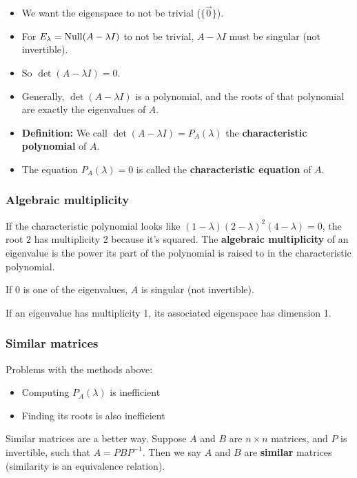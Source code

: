 \begin{itemize}
    \item We want the eigenspace to not be trivial ($\{\Vec 0\}$).
    \item For $E_{\lambda} = \operatorname{Null}(A - \lambda I)$ to not be trivial, $A - \lambda I$ must be singular (not invertible).
    \item So $\det(A - \lambda I) = 0$.
    \item Generally, $\det(A - \lambda I)$ is a polynomial, and the roots of that polynomial are exactly the eigenvalues of $A$.
    \item \textbf{Definition:} We call $\det(A - \lambda I) = P_A(\lambda)$ the \textbf{characteristic polynomial} of $A$.
    \item The equation $P_A(\lambda) = 0$ is called the \textbf{characteristic equation} of $A$.
\end{itemize}

\subsubsection*{Algebraic multiplicity}

If the characteristic polynomial looks like $(1 - \lambda)(2 - \lambda)^2(4 - \lambda) = 0$, the root $2$ has multiplicity 2 because it's squared. The \textbf{algebraic multiplicity} of an eigenvalue is the power its part of the polynomial is raised to in the characteristic polynomial.

If 0 is one of the eigenvalues, $A$ is singular (not invertible).

If an eigenvalue has multiplicity 1, its associated eigenspace has dimension 1.

\subsubsection*{Similar matrices}

Problems with the methods above:
\begin{itemize}
    \item Computing $P_A(\lambda)$ is inefficient
    \item Finding its roots is also inefficient
\end{itemize}

Similar matrices are a better way. Suppose $A$ and $B$ are $n \times n$ matrices, and $P$ is invertible, such that $A = PBP^{-1}$. Then we say $A$ and $B$ are \textbf{similar} matrices (similarity is an equivalence relation).

